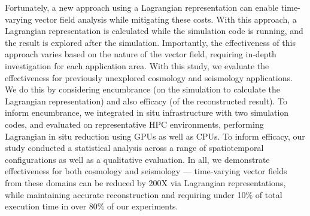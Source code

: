 %
Fortunately, a new approach using a Lagrangian representation can 
enable time-varying vector field analysis while mitigating these costs.
%
With this approach, a Lagrangian representation is calculated while the simulation code is running, and the result is explored after the simulation.
%
Importantly, 
 the effectiveness of this approach varies based on the nature of the vector field, 
requiring in-depth investigation for each application area.
%
With this study, we evaluate the effectiveness for previously unexplored cosmology and seismology
applications. %
%
We do this by considering encumbrance (on the simulation to calculate the
Lagrangian representation) and also efficacy (of the reconstructed result).
%
To inform encumbrance, we 
integrated in situ infrastructure with two simulation codes, 
and evaluated on representative HPC environments,
performing Lagrangian in situ reduction using GPUs as well as CPUs.
%
To inform efficacy, our study conducted a statistical analysis across a range of spatiotemporal configurations as well as a qualitative evaluation.
%
In all, we demonstrate effectiveness for both cosmology and seismology --- time-varying vector fields from these domains can be reduced by 200X via Lagrangian representations, while maintaining accurate reconstruction and requiring under 10\% of total execution time in over 80\% of our experiments.
